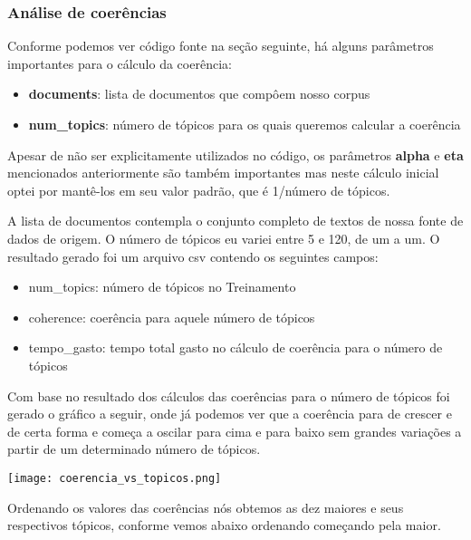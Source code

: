 \subsubsection{Análise de coerências}

Conforme podemos ver código fonte na seção seguinte, há alguns parâmetros importantes para o cálculo da coerência:

\begin{itemize}
    \item \textbf{documents}: lista de documentos que compôem nosso corpus
    \item \textbf{num\_topics}: número de tópicos para os quais queremos calcular a coerência
\end{itemize}

Apesar de não ser explicitamente utilizados no código, os parâmetros \textbf{alpha} e \textbf{eta} mencionados anteriormente são também importantes mas neste cálculo inicial
optei por mantê-los em seu valor padrão, que é 1/número de tópicos. 

A lista de documentos contempla o conjunto completo de textos de nossa fonte de dados de origem. O número de tópicos eu variei entre 5 e 120, de um 
a um. O resultado gerado foi um arquivo csv contendo os seguintes campos:

\begin{itemize}
    \item num\_topics: número de tópicos no Treinamento
    \item coherence: coerência para aquele número de tópicos
    \item tempo\_gasto: tempo total gasto no cálculo de coerência para o número de tópicos
\end{itemize}

Com base no resultado dos cálculos das coerências para o número de tópicos foi gerado o gráfico a seguir, onde já podemos ver que a coerência para 
de crescer e de certa forma e começa a oscilar para cima e para baixo sem grandes variações a partir de um determinado número de tópicos.

\texttt{[image: coerencia\_vs\_topicos.png]}

Ordenando os valores das coerências nós obtemos as dez maiores e seus respectivos tópicos, conforme vemos abaixo ordenando começando pela maior.

